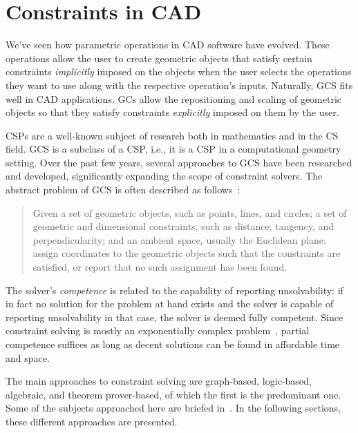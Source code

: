 \section{Constraints in \acs{CAD}}%
\label{sec:intro.constraints}

We've seen how parametric operations in \ac{CAD} software have evolved.  These
operations allow the user to create geometric objects that satisfy certain
constraints \textit{implicitly} imposed on the objects when the user selects the
operations they want to use along with the respective operation's inputs.
Naturally, \ac{GCS} fits well in \ac{CAD} applications.  \Acp{GC} allow the
repositioning and scaling of geometric objects so that they satisfy constraints
\textit{explicitly} imposed on them by the user.

\acp{CSP} are a well-known subject of research both in mathematics and in the
\ac{CS} field.  \ac{GCS} is a subclass of a \ac{CSP}, i.e., it is a \ac{CSP} in
a computational geometry setting.  Over the past few years, several approaches to
\ac{GCS} have been researched and developed, significantly expanding the scope
of constraint solvers.  The abstract problem of \ac{GCS} is often described as
follows~\cite{Bettig:2011:GCSPC}:

\begin{quote}
  Given a set of geometric objects, such as points, lines, and circles; a set of
  geometric and dimensional constraints, such as distance, tangency, and
  perpendicularity; and an ambient space, usually the Euclidean plane; assign
  coordinates to the geometric objects such that the constraints are satisfied,
  or report that no such assignment has been found.
\end{quote}

The solver's \textit{competence} is related to the capability of reporting
unsolvability: if in fact no solution for the problem at hand exists and the
solver is capable of reporting unsolvability in that case, the solver is deemed
fully competent.  Since constraint solving is mostly an exponentially complex
problem~\cite{Rossi:2006:Handbook}, partial competence suffices as long as
decent solutions can be found in affordable time and space.

The main approaches to constraint solving are graph-based, logic-based,
algebraic, and theorem prover-based, of which the first is the predominant one.
Some of the subjects approached here are briefed in~\cite{Hoffmann:2005:BCS}.
In the following sections, these different approaches are presented.

